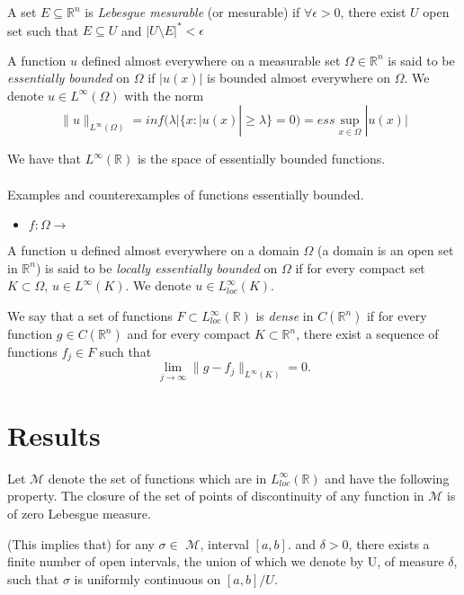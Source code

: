 \documentclass[../main.tex]{subfiles}
\begin{document}
\begin{definition}
A set $E\subseteq \mathbb{R}^n $ is \emph{Lebesgue mesurable} (or mesurable) if $\forall \epsilon >0$, there exist $U$ open set such that $E \subseteq U$ and $|U\setminus E|^* < \epsilon $
\end{definition}

\begin{definition}
	A function $u$ defined almost everywhere on a measurable set $\Omega \in \mathbb{R}^n$ is said to be \emph{essentially bounded} on $\Omega$ if $|u(x)|$ is bounded almost everywhere on $\Omega$. We denote $u\in L^{\infty}(\Omega)$ with the norm $$\|u\|_{L^{\infty}(\Omega)}= inf(\lambda | \{ x : |u(x)| \geq \lambda \} = 0 ) = ess \sup_{x\in \Omega} |u(x)|$$

\end{definition}

\noindent We have that $L^{\infty}(\mathbb{R})$ is the space of essentially bounded functions.
\\ \\ 
Examples and counterexamples of functions essentially bounded. 
\begin{itemize}
\item $f:\Omega \rightarrow $
\end{itemize}

\begin{definition}
	A function u defined almost everywhere on a domain $\Omega$ (a domain is an open set in $\mathbb{R}^n$) is said to be\emph{ locally essentially bounded }on $\Omega$ if for every compact set $K\subset \Omega$, $u\in L^{\infty}(K)$. We denote $u\in L_{loc}^{\infty}(K)$.
\end{definition}

\begin{definition}We say that a set of functions $F\subset L_{loc}^{\infty}(\mathbb{R})$ is \emph{dense} in $C(\mathbb{R}^n)$ if for every function $g\in C(\mathbb{R}^n)$ and for every compact $K\subset \mathbb{R}^n$, there exist a sequence of functions $f_j\in F$ such that $$\lim_{j\rightarrow\infty} \|g-f_j\|_{L^\infty(K)}=0.$$ 
\end{definition}

\section{Results}
\begin{definition} Let $\mathcal{M}$ denote the set of functions which are in $L_{loc}^{\infty}(\mathbb{R})$ and have the following property. The closure of the set of points of discontinuity of any function in $\mathcal{M}$ is of zero Lebesgue measure. 
\begin{propo}
(This implies that) for any $\sigma \in$ $\mathcal{M}$, interval $[a,b] .$ and $\delta >0$, there exists a finite number of open intervals, the union of which we denote by U, of measure $\delta$, such that $\sigma$ is uniformly continuous on $[a,b]/U$. 
\end{propo}
\end{definition}
\end{document}

